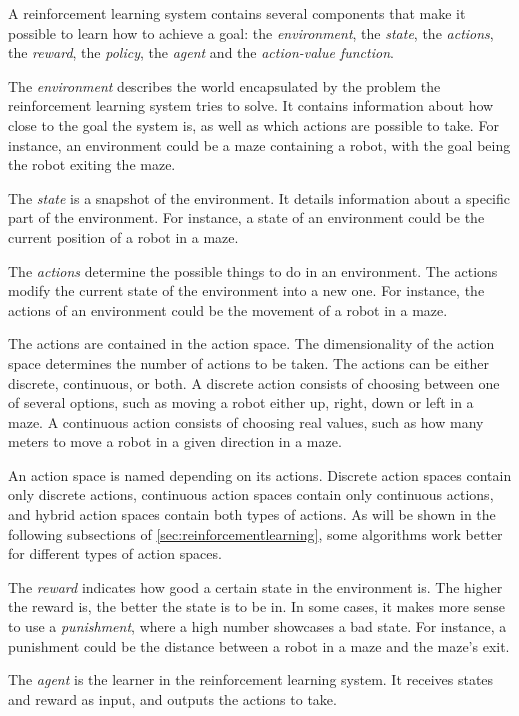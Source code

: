 \documentclass{kththesis}
\begin{document}
A reinforcement learning system contains several components that make it possible to learn how to achieve a goal: the \textit{environment}, the \textit{state}, the \textit{actions}, the \textit{reward}, the \textit{policy}, the \textit{agent} and the \textit{action-value function}.

The \textit{environment} describes the world encapsulated by the problem the reinforcement learning system tries to solve. It contains information about how close to the goal the system is, as well as which actions are possible to take. For instance, an environment could be a maze containing a robot, with the goal being the robot exiting the maze.

The \textit{state} is a snapshot of the environment. It details information about a specific part of the environment. For instance, a state of an environment could be the current position of a robot in a maze.

The \textit{actions} determine the possible things to do in an environment. The actions modify the current state of the environment into a new one. For instance, the actions of an environment could be the movement of a robot in a maze. 

The actions are contained in the action space. The dimensionality of the action space determines the number of actions to be taken. The actions can be either discrete, continuous, or both. A discrete action consists of choosing between one of several options, such as moving a robot either up, right, down or left in a maze. A continuous action consists of choosing real values, such as how many meters to move a robot in a given direction in a maze.

An action space is named depending on its actions. Discrete action spaces contain only discrete actions, continuous action spaces contain only continuous actions, and hybrid action spaces contain both types of actions. As will be shown in the following subsections of \autoref{sec:reinforcementlearning}, some algorithms work better for different types of action spaces.

The \textit{reward} indicates how good a certain state in the environment is. The higher the reward is, the better the state is to be in. In some cases, it makes more sense to use a \textit{punishment}, where a high number showcases a bad state. For instance, a punishment could be the distance between a robot in a maze and the maze's exit. 

The \textit{agent} is the learner in the reinforcement learning system. It receives states and reward as input, and outputs the actions to take.
\end{document}
